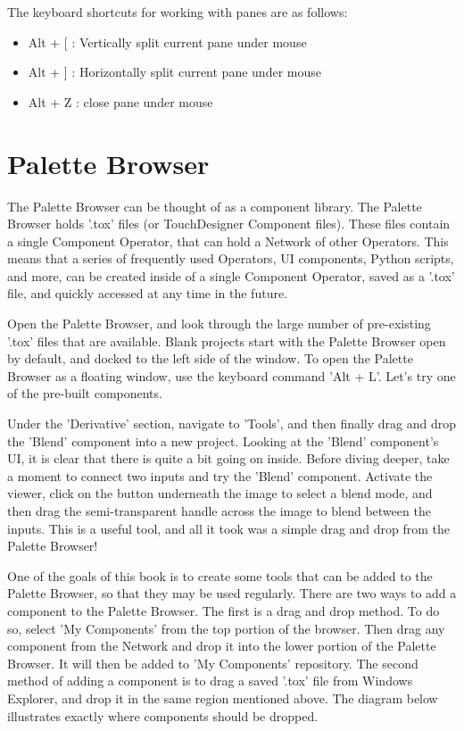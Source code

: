 \begin{fullwidth}
The keyboard shortcuts for working with panes are as follows:

\begin{itemize}
\item Alt + [ : Vertically split current pane under mouse
\item Alt + ] : Horizontally split current pane under mouse
\item Alt + Z : close pane under mouse
\end{itemize}

\end{fullwidth}
\section{Palette Browser}

\begin{fullwidth}

The Palette Browser can be thought of as a component library. The Palette Browser holds '.tox' files (or TouchDesigner Component files). These files contain a single Component Operator, that can hold a Network of other Operators. This means that a series of frequently used Operators, UI components, Python scripts, and more, can be created inside of a single Component Operator, saved as a '.tox' file, and quickly accessed at any time in the future.

Open the Palette Browser, and look through the large number of pre-existing '.tox' files that are available. Blank projects start with the Palette Browser open by default, and docked to the left side of the window. To open the Palette Browser as a floating window, use the keyboard command 'Alt + L'. Let's try one of the pre-built components. 

Under the 'Derivative' section, navigate to 'Tools', and then finally drag and drop the 'Blend' component into a new project. Looking at the 'Blend' component's UI, it is clear that there is quite a bit going on inside. Before diving deeper, take a moment to connect two inputs and try the 'Blend' component. Activate the viewer, click on the button underneath the image to select a blend mode, and then drag the semi-transparent handle across the image to blend between the inputs. This is a useful tool, and all it took was a simple drag and drop from the Palette Browser!

One of the goals of this book is to create some tools that can be added to the Palette Browser, so that they may be used regularly. There are two ways to add a component to the Palette Browser. The first is a drag and drop method. To do so, select 'My Components' from the top portion of the browser. Then drag any component from the Network and drop it into the lower portion of the Palette Browser. It will then be added to 'My Components' repository. The second method of adding a component is to drag a saved '.tox' file from Windows Explorer, and drop it in the same region mentioned above. The diagram below illustrates exactly where components should be dropped.  


\end{fullwidth}

